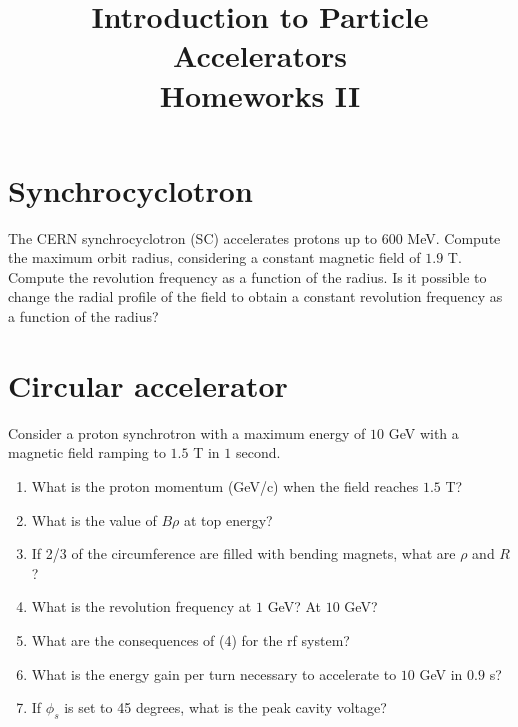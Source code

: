 \documentclass[12pt]{article}
\begin{document}
\title{Introduction to Particle Accelerators\\
\large Homeworks II}
\author{}
\date{}
 
\maketitle
 
\section{Synchrocyclotron}
\label{problem1}
The CERN synchrocyclotron (SC) accelerates protons up to $600$ MeV. Compute the maximum orbit radius, considering a constant magnetic field of $1.9$ T. Compute the revolution frequency as a function of the radius. Is it possible to change the radial profile of the field to obtain a constant revolution frequency as a function of the radius?

\section{Circular accelerator}
\label{problem2}
Consider a proton synchrotron with a maximum energy of $10$ GeV with a magnetic field ramping to $1.5$ T in $1$ second.

\begin{enumerate}
\item What is the proton momentum (GeV/c) when the field reaches $1.5$ T?
\item What is the value of $B\rho$ at top energy?
\item If 2/3 of the circumference are filled with bending magnets, what are $\rho$ and $R$?
\item What is the revolution frequency at $1$ GeV? At $10$ GeV?
\item What are the consequences of (4) for the rf system?
\item What is the energy gain per turn necessary to accelerate to $10$ GeV in $0.9$ s?
\item If $\phi_s$ is set to 45 degrees, what is the peak cavity voltage?
\end{enumerate}
\end{document}
